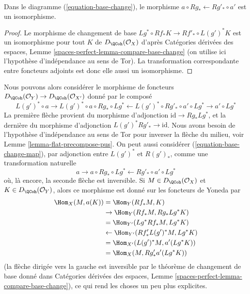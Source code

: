 \begin{lemma}
\label{lemma-flat-precompose-pus}
Dans le diagramme (\ref{equation-base-change}), le morphisme
$a \circ Rg_* \leftarrow Rg'_* \circ a'$ est un isomorphisme.
\end{lemma}

\begin{proof}
Le morphisme de changement de base $Lg^* \circ Rf_* K \to Rf'_* \circ L(g')^*K$
est un isomorphisme pour tout $K$ de $D_\QCoh(\mathcal{O}_X)$ d'après
Catégories dérivées des espaces, Lemme
\ref{spaces-perfect-lemma-compare-base-change}
(on utilise ici l'hypothèse d'indépendance au sens de Tor).
La transformation correspondante entre foncteurs adjoints est donc
elle aussi un isomorphisme.
\end{proof}

\noindent
Nous pouvons alors considérer le
morphisme de foncteurs
$D_\QCoh(\mathcal{O}_Y) \to D_\QCoh(\mathcal{O}_{X'})$
donné par le composé
\begin{equation}
\label{equation-base-change-map}
L(g')^* \circ a \to
L(g')^* \circ a \circ Rg_* \circ Lg^* \leftarrow
L(g')^* \circ Rg'_* \circ a' \circ Lg^* \to a' \circ Lg^*
\end{equation}
La première flèche provient du morphisme d'adjonction $\text{id} \to Rg_* Lg^*$,
et la dernière du morphisme d'adjonction $L(g')^*Rg'_* \to \text{id}$.
Nous avons besoin de l'hypothèse d'indépendance au sens de Tor pour inverser la flèche
du milieu, voir Lemme \ref{lemma-flat-precompose-pus}.
On peut aussi considérer (\ref{equation-base-change-map}), par
adjonction entre $L(g')^*$ et $R(g')_*$, comme une transformation naturelle
$$
a \to a \circ Rg_* \circ Lg^* \leftarrow Rg'_* \circ a' \circ Lg^*
$$
où, là encore, la seconde flèche est inversible. Si $M \in D_\QCoh(\mathcal{O}_X)$
et $K \in D_\QCoh(\mathcal{O}_Y)$,
alors ce morphisme est donné sur les foncteurs de Yoneda par
\begin{align*}
\Hom_X(M, a(K))
& =
\Hom_Y(Rf_*M, K) \\
& \to
\Hom_Y(Rf_*M, Rg_* Lg^*K) \\
& =
\Hom_{Y'}(Lg^*Rf_*M, Lg^*K) \\
& \leftarrow
\Hom_{Y'}(Rf'_* L(g')^*M, Lg^*K) \\
& =
\Hom_{X'}(L(g')^*M, a'(Lg^*K)) \\
& =
\Hom_X(M, Rg'_*a'(Lg^*K))
\end{align*}
(la flèche dirigée vers la gauche est inversible par le théorème de
changement de base donné dans
Catégories dérivées des espaces, Lemme
\ref{spaces-perfect-lemma-compare-base-change}),
ce qui rend les choses un peu plus explicites.

